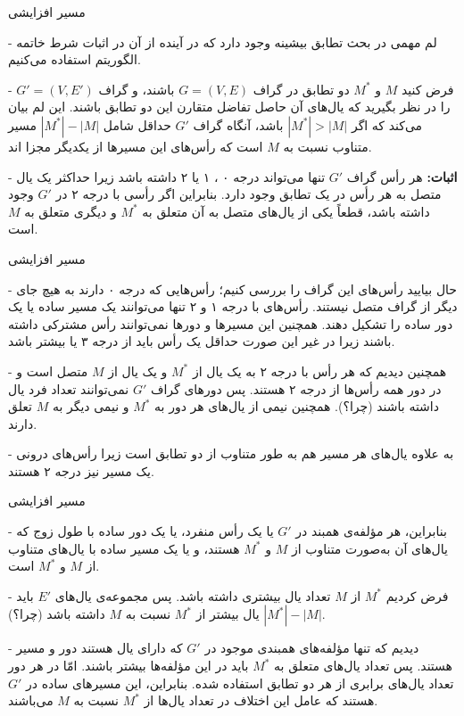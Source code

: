 \begin{itemframe}{مسیر افزایشی}
\item[-]
لم مهمی در بحث تطابق بیشینه وجود دارد که در آینده از آن در اثبات شرط خاتمه الگوریتم استفاده می‌کنیم.
\item[-]
فرض کنید
$M$ و
$M^*$
دو تطابق در گراف
$G = (V, E)$
 باشند، و گراف
$G' = (V, E')$
را در نظر بگیرید که یال‌های آن حاصل تفاضل متقارن این دو تطابق باشند. این لم بیان می‌کند که  اگر
$|M^*| > |M|$
باشد، آنگاه گراف $G'$ حداقل شامل $|M^*| - |M|$ مسیر متناوب نسبت به $M$ است که رأس‌های این مسیرها از یکدیگر مجزا اند.
\item[-]
\textbf{اثبات:}
هر رأس گراف $G'$ تنها می‌تواند درجه ۰ ، ۱ یا ۲ داشته باشد زیرا حداکثر یک یال متصل به هر رأس در یک تطابق وجود دارد. بنابراین اگر رأسی با درجه ۲ در  $G'$ وجود داشته باشد، قطعاً یکی از یال‌های متصل به آن متعلق به $M^*$ و دیگری متعلق به $M$ است.

\end{itemframe}


\begin{itemframe}{مسیر افزایشی}
\item[-]
حال بیایید رأس‌های این گراف را بررسی کنیم؛ رأس‌هایی که درجه ۰ دارند به هیچ جای دیگر از گراف متصل نیستند. رأس‌های با درجه ۱ و ۲ تنها می‌توانند یک مسیر ساده یا یک دور ساده را تشکیل دهند. همچنین این مسیرها و دور‌ها نمی‌توانند رأس مشترکی داشته باشند زیرا در غیر این صورت حداقل یک رأس باید از درجه ۳ یا بیشتر باشد.

\item[-]
همچنین دیدیم که هر رأس با درجه ۲ به یک یال از $M^*$ و یک یال از $M$ متصل است و در دور همه رأس‌ها از درجه ۲ هستند. پس دورهای گراف $G'$ نمی‌توانند تعداد فرد یال داشته باشند (چرا؟). همچنین نیمی از یال‌های هر دور به $M^*$ و نیمی دیگر به $M$ تعلق دارند.

\item[-]
به علاوه یال‌های هر مسیر هم به طور متناوب از دو تطابق است زیرا رأس‌های درونی یک مسیر نیز درجه ۲ هستند.

\end{itemframe}


\begin{itemframe}{مسیر افزایشی}
\item[-]
بنابراین، هر مؤلفه‌ی همبند در $G'$ یا یک رأس منفرد، یا یک دور ساده با طول زوج که یال‌های آن به‌صورت متناوب از $M$ و $M^*$ هستند، و یا یک مسیر ساده با یال‌های متناوب از $M$ و $M^*$ است.

\item[-]
فرض کردیم  $M^*$ از $M$ تعداد یال بیشتری داشته باشد.
پس مجموعه‌ی یال‌های $E'$ باید $|M^*| - |M|$ یال بیشتر از $M^*$ نسبت به $M$ داشته باشد (چرا؟).
\item[-]
دیدیم که تنها مؤلفه‌های همبندی موجود در $G'$ که دارای یال ‌هستند دور و مسیر هستند. پس تعداد یال‌های متعلق به $M^*$ باید در این مؤلفه‌ها بیشتر باشند. امّا در هر دور تعداد یال‌های برابری از هر دو تطابق استفاده شده. بنابراین، این مسیرهای ساده در $G'$ هستند که عامل این اختلاف در تعداد یال‌ها از $M^*$ نسبت به $M$ می‌باشند.

\end{itemframe}


